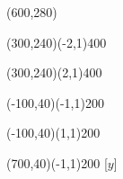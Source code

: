 \documentclass[12pt]{article}
\begin{document}
\begin{figure}[htb]
\hspace*{\fill}
\begin{egame}(600,280)

\renewcommand{\egarrowstyle}{e}

\putbranch(300,240)(-2,1){400}

\renewcommand{\egarrowstyle}{e}

\putbranch(300,240)(2,1){400}

\renewcommand{\egarrowstyle}{e}

\putbranch(-100,40)(-1,1){200}

\renewcommand{\egarrowstyle}{e}

\putbranch(-100,40)(1,1){200}

\renewcommand{\egarrowstyle}{e}

\putbranch(700,40)(-1,1){200}
\ib{}{}[$y$] 

\renewcommand{\egarrowstyle}{e}


\end{egame}
\end{figure}
\end{document}
